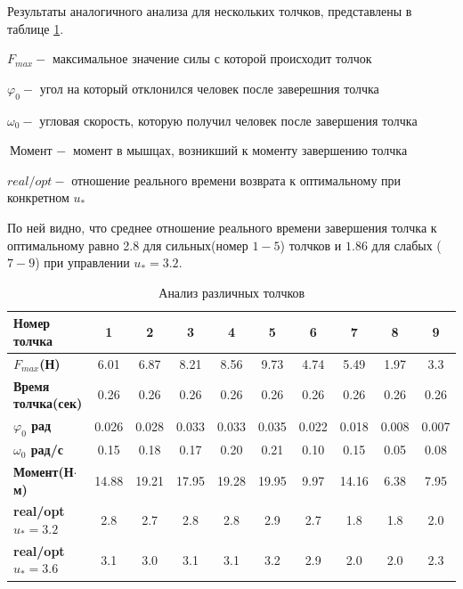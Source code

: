 \documentclass[a4paper,12pt, openany]{book}
\theoremstyle{plain} %
\theoremstyle{definition} %
\theoremstyle{remark} %
\numberwithin{equation}{chapter}
\begin{document}
{Результаты аналогичного анализа для нескольких толчков,
представлены в таблице \ref{final_table}.

$F_{max} - $ максимальное значение силы с которой происходит толчок

$\varphi_0 - $ угол на который отклонился человек после заверешния толчка

$\omega_0 - $ угловая скорость, которую получил человек после завершения толчка

$\text{Момент } - $ момент в мышцах, возникший к моменту завершению толчка

$real/opt - $ отношение реального времени возврата к оптимальному при конкретном $u_\ast$

По ней видно, что среднее отношение реального времени завершения толчка к оптимальному равно 2.8 для сильных(номер $1-5$)
толчков и $1.86$ для слабых ($7-9$) при управлении $u_*=3.2$.


\begin{table}[h!]
    \centering
    \begin{tabular}{|l|c|c|c|c|c|c|c|c|c|}
        \hline
        \textbf{Номер толчка}       & \textbf{1} & \textbf{2} & \textbf{3} & \textbf{4} & \textbf{5} & \textbf{6} & \textbf{7} & \textbf{8} & \textbf{9} \\ \hline
        \textbf{$F_{max}$(Н)}       & 6.01       & 6.87       & 8.21       & 8.56       & 9.73       & 4.74       & 5.49       & 1.97       & 3.3        \\ \hline
        \textbf{Время толчка(сек)}  & 0.26       & 0.26       & 0.26       & 0.26       & 0.26       & 0.26       & 0.26       & 0.26       & 0.26       \\ \hline
        \textbf{$\varphi_0$ рад}        & 0.026      & 0.028      & 0.033      & 0.033      & 0.035      & 0.022      & 0.018      & 0.008      & 0.007      \\ \hline
        \textbf{$\omega_0$ рад/с}         & 0.15     & 0.18     & 0.17     & 0.20     & 0.21     & 0.10     & 0.15     & 0.05     & 0.08     \\ \hline
        \textbf{Момент(Н$\cdot$м)}       & 14.88      & 19.21      & 17.95      & 19.28      & 19.95      & 9.97       & 14.16      & 6.38       & 7.95       \\ \hline
        \textbf{real/opt $u_*=3.2$} & 2.8        & 2.7        & 2.8        & 2.8        & 2.9        & 2.7        & 1.8        & 1.8        & 2.0        \\ \hline
        \textbf{real/opt $u_*=3.6$} & 3.1        & 3.0        & 3.1        & 3.1        & 3.2        & 2.9        & 2.0        & 2.0        & 2.3        \\ \hline
    \end{tabular}
    \caption{Анализ различных толчков}
    \label{final_table}
\end{table}
\newpage
}
\end{document}
